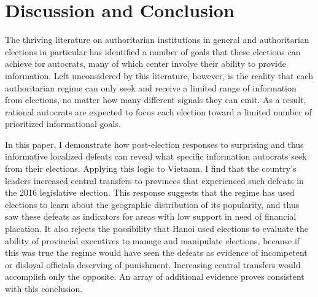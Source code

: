 \documentclass[12pt]{article}
\newcommand{\1}{\mathbbm{1}}
\begin{document}
%
%

\section*{Discussion and Conclusion}

The thriving literature on authoritarian institutions in general and authoritarian elections in particular has identified a number of goals that these elections can achieve for autocrats, many of which center involve their ability to provide information. Left unconsidered by this literature, however, is the reality that each authoritarian regime can only seek and receive a limited range of information from elections, no matter how many different signals they can emit. As a result, rational autocrats are expected to focus each election toward a limited number of prioritized informational goals.

In this paper, I demonstrate how post-election responses to surprising and thus informative localized defeats can reveal what specific information autocrats seek from their elections. Applying this logic to Vietnam, I find that the country's leaders increased central transfers to provinces that experienced such defeats in the 2016 legislative election. This response suggests that the regime has used elections to learn about the geographic distribution of its popularity, and thus saw these defeats as indicators for areas with low support in need of financial placation. It also rejects the possibility that Hanoi used elections to evaluate the ability of provincial executives to manage and manipulate elections, because if this was true the regime would have seen the defeats as evidence of incompetent or disloyal officials deserving of punishment. Increasing central transfers would accomplish only the opposite. An array of additional evidence proves consistent with this conclusion.
\end{document}
